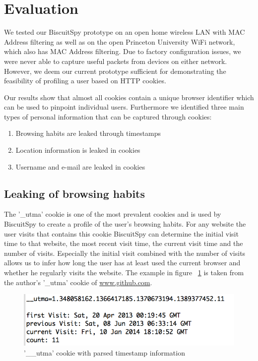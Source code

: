 \section{Evaluation}
\label{sec:eval}

We tested our BiscuitSpy prototype on an open home wireless LAN with MAC Address filtering as well as on the open Princeton University WiFi network, which also has MAC Address filtering. Due to factory configuration issues, we were never able to capture useful packets from devices on either network. However, we deem our current prototype sufficient for demonstrating the feasibility of profiling a user based on HTTP cookies.

Our results show that almost all cookies contain a unique browser identifier which can be used to pinpoint individual users. Furthermore we identified three main types of personal information that can be captured through cookies:

\begin{enumerate} \itemsep1pt \parskip0pt 
  \item Browsing habits are leaked through timestamps
  \item Location information is leaked in cookies
  \item Username and e-mail are leaked in cookies
\end{enumerate}

\subsection{Leaking of browsing habits}
The '\_utma' cookie is one of the most prevalent cookies and is used by BiscuitSpy to create a profile of the user's browsing habits. For any website the user visits that contains this cookie BiscuitSpy can determine the initial visit time to that website, the most recent visit time, the current visit time and the number of visits. Especially the initial visit combined with the number of visits allows us to infer how long the user has at least used the current browser and whether he regularly visits the website. The example in figure ~\ref{fig:utma2} is taken from the author's '\_utma' cookie of  \url{www.github.com}.

\begin{figure}[h]
\centering
\includegraphics[scale=0.4]{./diagrams/utma2.png}
\caption{'\_\_utma' cookie with parsed timestamp information}
\label{fig:utma2}
\end{figure}


